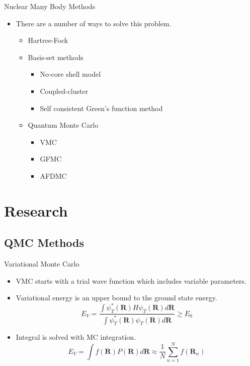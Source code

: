 \documentclass{beamer}
\newcommand{\R}{\mathbf{R}}
\begin{document}
\begin{frame}{Nuclear Many Body Methods}
\begin{itemize}
   \item There are a number of ways to solve this problem.
   \begin{itemize}
      \item Hartree-Fock
      \item Basis-set methods
      \begin{itemize}
         \item No-core shell model
         \item Coupled-cluster
         \item Self consistent Green's function method
      \end{itemize}
      \item Quantum Monte Carlo
      \begin{itemize}
         \item VMC
         \item GFMC
         \item AFDMC
      \end{itemize}
   \end{itemize}
\end{itemize}
\end{frame}

\section{Research}
\subsection{QMC Methods}
\begin{frame}{Variational Monte Carlo}
\begin{itemize}
   \item VMC starts with a trial wave function which includes variable parameters.
   \item Variational energy is an upper bound to the ground state energy.
   \begin{equation*}
      E_V = \frac{\int\psi_T^*(\R)H\psi_T(\R)d\R}{\int\psi_T^*(\R)\psi_T(\R)d\R} \ge E_0
   \end{equation*}
   \item Integral is solved with MC integration.
   \begin{equation*}
      E_V = \int f(\R)P(\R) d\R \approx \frac{1}{N}\sum\limits_{n=1}^N f(\R_n)
   \end{equation*}
\end{itemize}
\end{frame}
\end{document}

